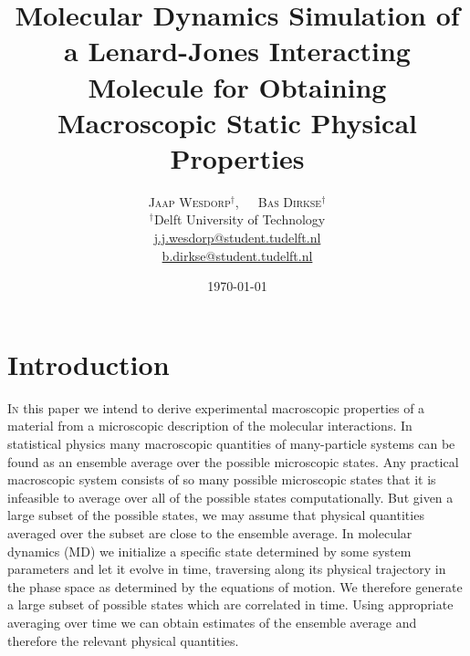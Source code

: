 \documentclass[twoside]{article}
\title{\vspace{-15mm}\fontsize{18pt}{10pt}\selectfont\textbf{Molecular Dynamics Simulation of a Lenard-Jones Interacting Molecule for Obtaining Macroscopic Static Physical Properties}} %
\author{
	\large
	\textsc{Jaap Wesdorp}$^\dagger$, $\hspace{10pt}$ \textsc{Bas Dirkse}$^\dagger$ \\ %
	\normalsize $^\dagger$Delft University of Technology \\ %
	\normalsize \href{mailto:j.j.wesdorp@student.tudelft.nl}{j.j.wesdorp@student.tudelft.nl} \\
	\normalsize \href{mailto:b.dirkse@student.tudelft.nl}{b.dirkse@student.tudelft.nl} 
}
\date{\today\vspace{-8mm}}
\begin{document}


\maketitle %
\thispagestyle{firststyle} %


\begin{abstract}
	\noindent  \lipsum[1]
	
\end{abstract}


\section{Introduction}

\lettrine[nindent=1em,lines=2]{I}
n this paper we intend to derive experimental macroscopic properties of a material from a microscopic description of the molecular interactions. In statistical physics many macroscopic quantities of many-particle systems can be found as an ensemble average over the possible microscopic states. Any practical macroscopic system consists of so many possible microscopic states that it is infeasible to average over all of the possible states computationally. But given a large subset of the possible states, we may assume that physical quantities averaged over the subset are close to the ensemble average. In molecular dynamics (MD) we initialize a specific state determined by some system parameters and let it evolve in time, traversing along its physical trajectory in the phase space as determined by the equations of motion. We therefore generate a large subset of possible states which are correlated in time. Using appropriate averaging over time we can obtain estimates of the ensemble average and therefore the relevant physical quantities.
\end{document}
